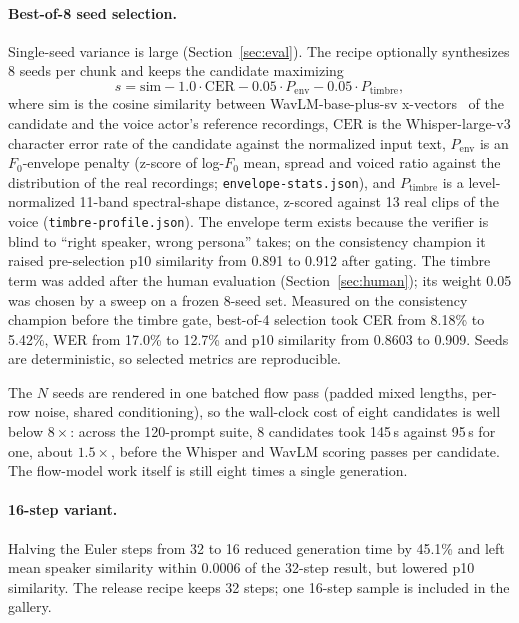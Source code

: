 \documentclass[10pt,twocolumn]{article}
\newcommand{\code}[1]{\texttt{#1}}
\begin{document}
\paragraph{Best-of-8 seed selection.} Single-seed variance is large (Section~\ref{sec:eval}). The recipe optionally synthesizes 8 seeds per chunk and keeps the candidate maximizing
\begin{equation}
  s = \mathrm{sim} - 1.0\cdot\mathrm{CER} - 0.05\cdot P_{\mathrm{env}} - 0.05\cdot P_{\mathrm{timbre}},
  \label{eq:score}
\end{equation}
where $\mathrm{sim}$ is the cosine similarity between WavLM-base-plus-sv x-vectors~\citep{chen2022wavlm} of the candidate and the voice actor's reference recordings, $\mathrm{CER}$ is the Whisper-large-v3 character error rate of the candidate against the normalized input text, $P_{\mathrm{env}}$ is an $F_0$-envelope penalty (z-score of log-$F_0$ mean, spread and voiced ratio against the distribution of the real recordings; \code{envelope-stats.json}), and $P_{\mathrm{timbre}}$ is a level-normalized 11-band spectral-shape distance, z-scored against 13 real clips of the voice (\code{timbre-profile.json}). The envelope term exists because the verifier is blind to ``right speaker, wrong persona'' takes; on the consistency champion it raised pre-selection p10 similarity from 0.891 to 0.912 after gating. The timbre term was added after the human evaluation (Section~\ref{sec:human}); its weight 0.05 was chosen by a sweep on a frozen 8-seed set. Measured on the consistency champion before the timbre gate, best-of-4 selection took CER from 8.18\% to 5.42\%, WER from 17.0\% to 12.7\% and p10 similarity from 0.8603 to 0.909. Seeds are deterministic, so selected metrics are reproducible.

The $N$ seeds are rendered in one batched flow pass (padded mixed lengths, per-row noise, shared conditioning), so the wall-clock cost of eight candidates is well below $8\times$: across the 120-prompt suite, 8 candidates took 145\,s against 95\,s for one, about $1.5\times$, before the Whisper and WavLM scoring passes per candidate. The flow-model work itself is still eight times a single generation.

\paragraph{16-step variant.} Halving the Euler steps from 32 to 16 reduced generation time by 45.1\% and left mean speaker similarity within 0.0006 of the 32-step result, but lowered p10 similarity. The release recipe keeps 32 steps; one 16-step sample is included in the gallery.
\end{document}

